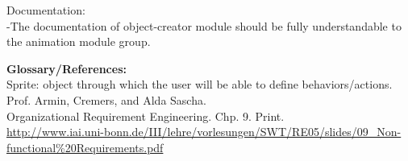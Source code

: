 \documentclass[12pt]{report}
\begin{document}
Documentation:\\
-The documentation of object-creator module should be fully understandable to the animation module group.\\
\pagebreak

{\bf\large Glossary/References:}\\[1\baselineskip]
Sprite: object through which the user will be able to define behaviors/actions.
\\[1\baselineskip]
Prof. Armin, Cremers, and Alda Sascha. \\
Organizational Requirement Engineering. Chp. 9. Print.\\
\url{http://www.iai.uni-bonn.de/III/lehre/vorlesungen/SWT/RE05/slides/09_Non-functional\%20Requirements.pdf}
\end{document}
